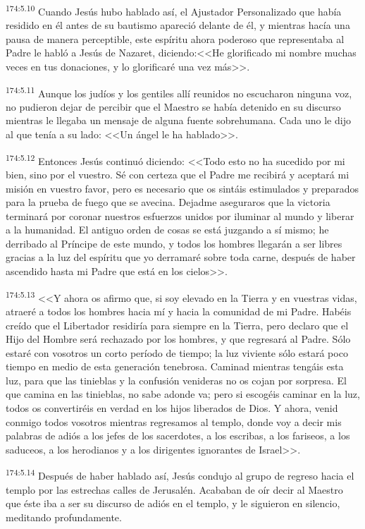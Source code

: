 \par 
\textsuperscript{174:5.10} Cuando Jesús hubo hablado así, el Ajustador Personalizado que había residido en él antes de su bautismo apareció delante de él, y mientras hacía una pausa de manera perceptible, este espíritu ahora poderoso que representaba al Padre le habló a Jesús de Nazaret, diciendo:<<He glorificado mi nombre muchas veces en tus donaciones, y lo glorificaré una vez más>>.

\par 
\textsuperscript{174:5.11} Aunque los judíos y los gentiles allí reunidos no escucharon ninguna voz, no pudieron dejar de percibir que el Maestro se había detenido en su discurso mientras le llegaba un mensaje de alguna fuente sobrehumana. Cada uno le dijo al que tenía a su lado: <<Un ángel le ha hablado>>.

\par 
\textsuperscript{174:5.12} Entonces Jesús continuó diciendo: <<Todo esto no ha sucedido por mi bien, sino por el vuestro. Sé con certeza que el Padre me recibirá y aceptará mi misión en vuestro favor, pero es necesario que os sintáis estimulados y preparados para la prueba de fuego que se avecina. Dejadme aseguraros que la victoria terminará por coronar nuestros esfuerzos unidos por iluminar al mundo y liberar a la humanidad. El antiguo orden de cosas se está juzgando a sí mismo; he derribado al Príncipe de este mundo, y todos los hombres llegarán a ser libres gracias a la luz del espíritu que yo derramaré sobre toda carne, después de haber ascendido hasta mi Padre que está en los cielos>>.

\par 
\textsuperscript{174:5.13} <<Y ahora os afirmo que, si soy elevado en la Tierra y en vuestras vidas, atraeré a todos los hombres hacia mí y hacia la comunidad de mi Padre. Habéis creído que el Libertador residiría para siempre en la Tierra, pero declaro que el Hijo del Hombre será rechazado por los hombres, y que regresará al Padre. Sólo estaré con vosotros un corto período de tiempo; la luz viviente sólo estará poco tiempo en medio de esta generación tenebrosa. Caminad mientras tengáis esta luz, para que las tinieblas y la confusión venideras no os cojan por sorpresa. El que camina en las tinieblas, no sabe adonde va; pero si escogéis caminar en la luz, todos os convertiréis en verdad en los hijos liberados de Dios. Y ahora, venid conmigo todos vosotros mientras regresamos al templo, donde voy a decir mis palabras de adiós a los jefes de los sacerdotes, a los escribas, a los fariseos, a los saduceos, a los herodianos y a los dirigentes ignorantes de Israel>>.

\par 
\textsuperscript{174:5.14} Después de haber hablado así, Jesús condujo al grupo de regreso hacia el templo por las estrechas calles de Jerusalén. Acababan de oír decir al Maestro que éste iba a ser su discurso de adiós en el templo, y le siguieron en silencio, meditando profundamente.